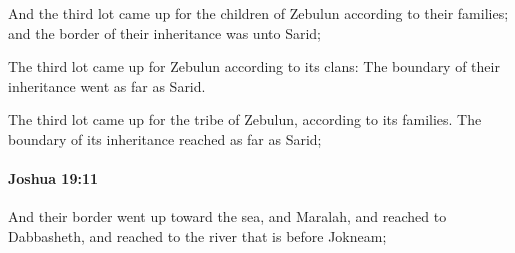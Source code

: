 			\begin{versebox}
					\item[BHS] 
					\item[ASV] And the third lot came up for the children of Zebulun according to their families; and the border of their inheritance was unto Sarid;
					\item[NIV] The third lot came up for Zebulun according to its clans: The boundary of their inheritance went as far as Sarid.
					\item[NRSV] The third lot came up for the tribe of Zebulun, according to its families. The boundary of its inheritance reached as far as Sarid;
			\end{versebox}

		\paragraph{Joshua 19:11} %
			\label{JOSHUA-19-11}

			And their border went up toward the sea, and Maralah, and reached to Dabbasheth, and reached to the river that is before Jokneam;

